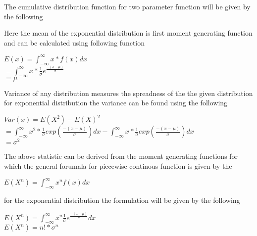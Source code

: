 \documentclass[12pt]{article}
\begin{document}
The cumulative distribution function for two parameter function will be given by the following
\begin{Parallel}[v]{0.48\textwidth}{0.48\textwidth}
\ParallelLText{	
\[
F(x)=
\begin{cases}
     1-e^{{\frac{-(x-\mu)}{\sigma}}} &\text{iff} -\infty<\mu<\infty,\\      \hfill x>\mu\\
     0                             &\text{otherwise}
\end{cases}
\]
}
\end{Parallel}
Here the mean of the exponential distribution is first moment generating function and can be calculated using following function\\
\begin{center}
$E(x)=\int_{-\infty}^{\infty}x*f(x)dx$\\
$=\int_{-\infty}^{\infty}x*\frac{1}{\sigma}e^{\frac{-(x-\mu)}{\sigma}}$\\
$=\mu$\\
\end{center}
Variance of any distribution measures the spreadness of the the given distribution for exponential distribution the variance can be found using the following
\begin{center}
	$Var(x)=E(X^2)-E(X)^2$\\
	$=\int_{-\infty}^{\infty} x^2*\frac{1}{\sigma}exp(\frac{-(x-\mu)}{\sigma}) dx -\int_{-\infty}^{\infty} x*\frac{1}{\sigma}exp(\frac{-(x-\mu)}{\sigma})dx$\\
	$=\sigma^2$
\end{center}

The above statistic can be derived from the moment generating functions for which the general forumala for piecewise continous function is given by the
\begin{center}
	$E(X^n)=\int_{-\infty}^{\infty} x^n f(x)dx$
\end{center}
for the exponential distribution the formulation will be given by the following
\begin{center}
	$E(X^n)=\int_{-\infty}^{\infty} x^{n}\frac{1}{\sigma}e^{\frac{-(x-\mu)}{\sigma}}dx$\\
	$E(X^n)=n!*\sigma^n$
\end{center}
\end{document}
